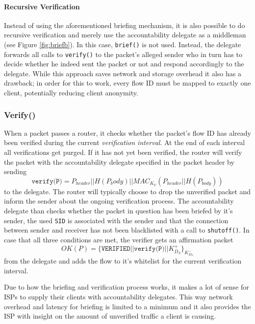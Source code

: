 \documentclass{acm_proc_article-sp}
\begin{document}
\paragraph{Recursive Verification}
Instead of using the aforementioned briefing mechanism, it is also possible to do recursive verification and merely use the accountability delegate as a middleman (see Figure \ref{fig:briefb}). In this case, \texttt{brief()} is not used. Instead, the delegate forwards all calls to \texttt{verify()} to the packet's alleged sender who in turn has to decide whether he indeed sent the packet or not and respond accordingly to the delegate. While this approach saves network and storage overhead it also has a drawback; in order for this to work, every flow ID must be mapped to exactly one client, potentially reducing client anonymity.

\subsubsection{Verify()}
When a packet passes a router, it checks whether the packet's flow ID has already been verified during the current \emph{verification interval}. At the end of each interval all verifications get purged. If it has not yet been verified, the router will verify the packet with the accountability delegate specified in the packet header by sending 
\begin{equation}
\texttt{verify(P)} = P_{header} || H(P_body) || MAC_{K_V}(P_{header} || H(P_{body}))
\end{equation}
to the delegate. The router will typically choose to drop the unverified packet and inform the sender about the ongoing verification process. The accountability delegate than checks whether the packet in question has been briefed by it's sender, the used \texttt{SID} is associated with the sender and that the connection between sender and receiver has not been blacklisted with a call to \texttt{shutoff()}. In case that all three conditions are met, the verifier gets an affirmation packet 
\begin{equation}
OK(P) = \{\texttt{VERIFIED} || \texttt{verify(P)} || K^+_{D_S}\}_{K^-_{D_S}}
\end{equation}
from the delegate and adds the flow to it's whitelist for the current verification interval.

Due to how the briefing and verification process works, it makes a lot of sense for ISPs to supply their clients with accountability delegates. This way network overhead and latency for briefing is limited to a minimum and it also provides the ISP with insight on the amount of unverified traffic a client is causing.
\end{document}
